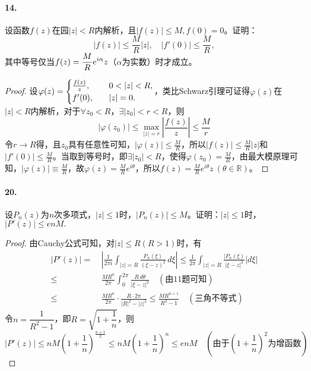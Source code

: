 \documentclass[12pt, a4paper, oneside]{ctexart}
\begin{document}
\paragraph{14.}设函数$f(z)$在园$|z|<R$内解析，且$|f(z)|\leqslant M,f(0) = 0$。证明：
\begin{equation*}
    |f(z)|\leqslant \frac{M}{R}|z|,\quad|f'(0)|\leqslant \frac{M}{R},
\end{equation*}
其中等号仅当$\displaystyle f(z)=\frac{M}{R}e^{i\alpha}z$（$\alpha$为实数）时才成立。
\begin{proof}
    设$\disp \varphi(z)=\begin{cases}
        \frac{f(z)}{z},\quad&0 <|z|<R,\\
        f'(0),\quad&|z| = 0.
    \end{cases}$，类比Schwarz引理可证得$\varphi(z)$在$|z| < R$内解析，对于$\forall z_0 < R$，$\exists |z_0| < r < R$，则\begin{equation*}
        |\varphi(z_0)|\leqslant \max_{|z|=r}\left|\frac{f(z)}{z}\right|\leqslant \frac{M}{r}
    \end{equation*}
    令$r\rightarrow R$得，且$z_0$具有任意性可知，$|\varphi(z)|\leqslant \frac{M}{R}$，所以$ |f(z)|\leqslant \frac{M}{R}|z|$和$|f'(0)|\leqslant \frac{M}{R}$。当取到等号时，即$\exists |z_0|<R$，使得$\varphi(z_0)=\frac{M}{R}$，由最大模原理可知，$|\varphi(z)|\equiv \frac{M}{R}$，故$\varphi(z) = \frac{M}{R}e^{i\theta}$，所以$ f(z)=\frac{M}{R}e^{i\theta}z\ (\theta\in \mathbb{R})$。
\end{proof}
\paragraph{20.}设$P_n(z)$为$n$次多项式，$|z|\leqslant 1$时，$|P_n(z)|\leqslant M$。证明：$|z|\leqslant 1$时，$|P'(z)|\leqslant enM.$
\begin{proof}
    由Cauchy公式可知，对$|z| \leqslant R(R> 1)$时，有
    \begin{equation*}
        \begin{aligned}
            |P'(z)| =&\ \left|\frac{1}{2\pi i}\int_{|z| = R}\frac{P_n(\xi)}{(\xi-z)^2}\,d\xi\right|\leqslant \frac{1}{2\pi}\int_{|z|=R}\frac{|P_n(\xi)}{|\xi-z|^2}|d\xi|\\
            \leqslant&\ \frac{MR^n}{2\pi}\int_0^{2\pi}\frac{R\,d\theta}{|\xi-z|^2}\quad(\text{由11题可知})\\
            \leqslant&\ \frac{MR^n}{2\pi}\cdot\frac{R\cdot 2\pi}{|R|^2-|z|^2}\leqslant \frac{MR^{n+1}}{R^2-1}\quad(\text{三角不等式})
        \end{aligned}
    \end{equation*}
    令$n = \dfrac{1}{R^2-1}$，即$R = \sqrt{1+\dfrac{1}{n}}$，则
    \begin{equation*}
        |P'(z)|\leqslant nM\left(1+\frac{1}{n}\right)^{\frac{n+1}{2}} \leqslant nM\left(1+\frac{1}{n}\right)^n\leqslant enM\quad(\text{由于}\left(1+\frac{1}{n}\right)^2\text{为增函数})
    \end{equation*}
\end{proof}
\end{document}
